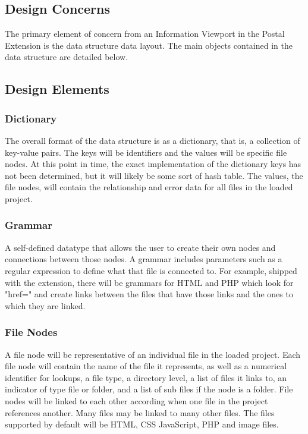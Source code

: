 \documentclass[letterpaper,10pt,titlepage,draftclsnofoot,onecolumn,onesided] {IEEEtran}
\begin{document}
\subsection{Design Concerns}
The primary element of concern from an Information Viewport in the Postal Extension is the data structure data layout. 
The main objects contained in the data structure are detailed below.

\subsection{Design Elements}

\subsubsection{Dictionary}
The overall format of the data structure is as a dictionary, that is, a collection of key-value pairs. 
The keys will be identifiers and the values will be specific file nodes. 
At this point in time, the exact implementation of the dictionary keys has not been determined, but it will likely be some sort of hash table.
The values, the file nodes, will contain the relationship and error data for all files in the loaded project.

\subsubsection{Grammar} A self-defined datatype that allows the user to create their own nodes and connections between those nodes.
A grammar includes parameters such as a regular expression to define what that file is connected to.
For example, shipped with the extension, there will be grammars for HTML and PHP which look for "href=" and create links between the files that have those links and the ones to which they are linked.

\subsubsection{File Nodes}
A file node will be representative of an individual file in the loaded project. 
Each file node will contain the name of the file it represents, as well as a numerical identifier for lookups, a file type, a directory level, a list of files it links to, an indicator of type file or folder, and a list of sub files if the node is a folder.
File nodes will be linked to each other according when one file in the project references another. 
Many files may be linked to many other files.
The files supported by default will be HTML, CSS JavaScript, PHP and image files.
		
\end{document}
